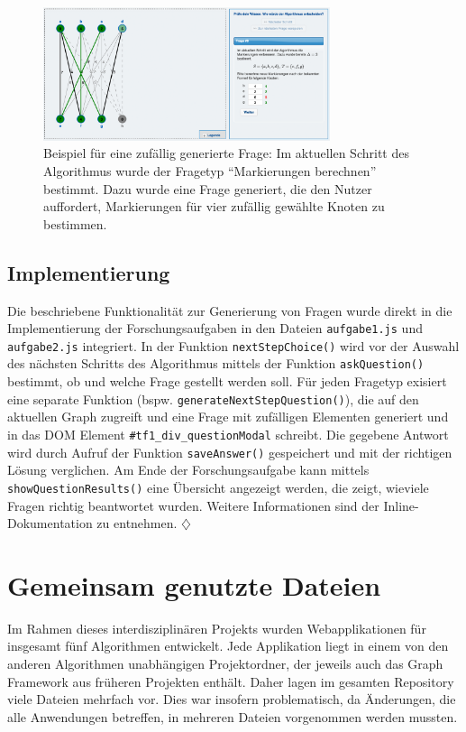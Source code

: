\begin{figure}[h!]
	\centering
	\includegraphics[width=0.75\textwidth]{figures/random_question}
	\caption[Zufällig generierte Frage]{Beispiel für eine zufällig generierte Frage: Im aktuellen Schritt des Algorithmus wurde der Fragetyp \enquote{Markierungen berechnen} bestimmt. Dazu wurde eine Frage generiert, die den Nutzer auffordert, Markierungen für vier zufällig gewählte Knoten zu bestimmen.}\label{fig:random-question}
\end{figure}

\subsection*{Implementierung} %
Die beschriebene Funktionalität zur Generierung von Fragen wurde direkt in die Implementierung der Forschungsaufgaben in den Dateien \texttt{aufgabe1.js} und \texttt{aufgabe2.js} integriert. In der Funktion \texttt{nextStepChoice()} wird vor der Auswahl des nächsten Schritts des Algorithmus mittels der Funktion \texttt{askQuestion()} bestimmt, ob und welche Frage gestellt werden soll. Für jeden Fragetyp exisiert eine separate Funktion (bspw. \texttt{generateNextStepQuestion()}), die auf den aktuellen Graph zugreift und eine Frage mit zufälligen Elementen generiert und in das DOM Element \texttt{\#tf1\_div\_questionModal} schreibt. Die gegebene Antwort wird durch Aufruf der Funktion \texttt{saveAnswer()} gespeichert und mit der richtigen Lösung verglichen. Am Ende der Forschungsaufgabe kann mittels \texttt{showQuestionResults()} eine Übersicht angezeigt werden, die zeigt, wieviele Fragen richtig beantwortet wurden. Weitere Informationen sind der Inline-Dokumentation zu entnehmen. \hfill$\diamondsuit$

\section{Gemeinsam genutzte Dateien} %
Im Rahmen dieses interdisziplinären Projekts wurden Webapplikationen für insgesamt fünf Algorithmen entwickelt. Jede Applikation liegt in einem von den anderen Algorithmen unabhängigen Projektordner, der jeweils auch das Graph Framework aus früheren Projekten enthält. Daher lagen im gesamten Repository viele Dateien mehrfach vor. Dies war insofern problematisch, da Änderungen, die alle Anwendungen betreffen, in mehreren Dateien vorgenommen werden mussten.


